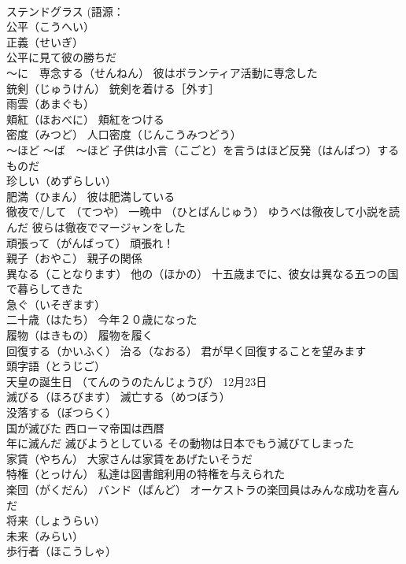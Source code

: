 \documentclass[8pt]{extreport}
\begin{document}
\begin{CJK}{UTF8}{min}
\\	ステンドグラス (語源：
\\	公平（こうへい） 
\\	正義（せいぎ）
\\	公平に見て彼の勝ちだ
\\	～に　専念する（せんねん） 彼はボランティア活動に専念した
\\	銃剣（じゅうけん） 銃剣を着ける［外す］
\\	雨雲（あまぐも）
\\	頬紅（ほおべに） 頬紅をつける
\\	密度（みつど） 人口密度（じんこうみつどう）
\\	～ほど ～ば　～ほど 子供は小言（こごと）を言うはほど反発（はんぱつ）するものだ
\\	珍しい（めずらしい）
\\	肥満（ひまん） 彼は肥満している
\\	徹夜で/して （てつや） 一晩中 （ひとばんじゅう） ゆうべは徹夜して小説を読んだ 彼らは徹夜でマージャンをした
\\	頑張って（がんばって） 頑張れ！
\\	親子（おやこ） 親子の関係
\\	異なる（ことなります） 他の（ほかの） 十五歳までに、彼女は異なる五つの国で暮らしてきた
\\	急ぐ（いそぎます）
\\	二十歳（はたち） 今年２０歳になった
\\	履物（はきもの） 履物を履く
\\	回復する（かいふく） 治る（なおる） 君が早く回復することを望みます
\\	頭字語（とうじご）
\\	天皇の誕生日 （てんのうのたんじょうび） 12月23日
\\	滅びる（ほろびます） 滅亡する（めつぼう）
\\	没落する（ぼつらく）
\\	国が滅びた 西ローマ帝国は西暦 
\\	年に滅んだ 滅びようとしている その動物は日本でもう滅びてしまった
\\	家賃（やちん） 大家さんは家賃をあげたいそうだ
\\	特権（とっけん） 私達は図書館利用の特権を与えられた
\\	楽団（がくだん） バンド（ばんど） オーケストラの楽団員はみんな成功を喜んだ
\\	将来（しょうらい）
\\	未来（みらい）
\\	歩行者（ほこうしゃ）

\end{CJK}
\end{document}
